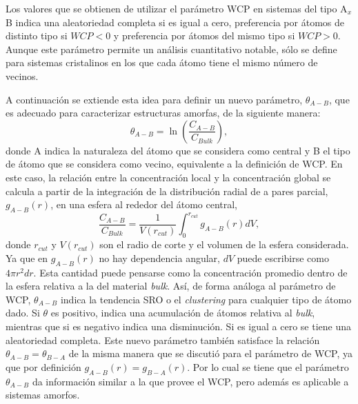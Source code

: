 Los valores que se obtienen de utilizar el parámetro WCP en sistemas del tipo
A$_x$B indica una aleatoriedad completa si es igual a cero, preferencia por 
átomos de distinto tipo si $WCP < 0$ y preferencia por átomos del mismo tipo si 
$WCP > 0$. Aunque este parámetro permite un análisis cuantitativo notable, sólo
se define para sistemas cristalinos en los que cada átomo tiene el mismo número
de vecinos. ~\cite{warren69}

A continuación se extiende esta idea para definir un nuevo parámetro, 
$\theta_{A-B}$, que es adecuado para caracterizar estructuras amorfas, de la 
siguiente manera:
\begin{equation}
    \theta_{A-B} = \ln \left( \frac{C_{A-B}}{C_{Bulk}} \right),
\end{equation}
donde A indica la naturaleza del átomo que se considera como central y B el tipo
de átomo que se considera como vecino, equivalente a la definición de WCP. En
este caso, la relación entre la concentración local y la concentración global se 
calcula a partir de la integración de la distribución radial de a pares parcial,
$g_{A-B}(r)$, en una esfera al rededor del átomo central,
\begin{equation}
    \frac{C_{A-B}}{C_{Bulk}} = \frac{1}{V(r_{cut})} \int_0^{r_{cut}} g_{A-B}(r) dV,
\end{equation}
donde $r_{cut}$ y $V(r_{cut})$ son el radio de corte y el volumen de la esfera 
considerada. Ya que en $g_{A-B}(r)$ no hay dependencia angular, $dV$ puede 
escribirse como $4 \pi r^2 dr$. Esta cantidad puede pensarse como la 
concentración promedio dentro de la esfera relativa a la del material 
\textit{bulk}. Así, de forma análoga al parámetro de WCP, $\theta_{A-B}$ indica 
la tendencia SRO o el \textit{clustering} para cualquier tipo de átomo dado.
Si $\theta$ es positivo, indica una acumulación de átomos relativa al 
\textit{bulk}, mientras que si es negativo indica una disminución. Si es igual a 
cero se tiene una aleatoriedad completa. Este nuevo parámetro también satisface 
la relación $\theta_{A-B} = \theta_{B-A}$ de la misma manera que se discutió para
el parámetro de WCP, ya que por definición $g_{A-B}(r) = g_{B-A}(r)$. Por lo cual 
se tiene que el parámetro $\theta_{A-B}$ da información similar a la que provee 
el WCP, pero además es aplicable a sistemas amorfos.


